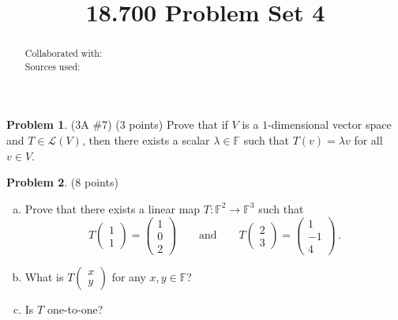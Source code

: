 \documentclass[reqno, 12pt]{amsart}
\theoremstyle{definition}
\newenvironment{problab}[1]
{\noindent\textbf{Problem #1}.}
{\vskip 6pt}
\theoremstyle{remark}
\newtheorem*{soln}{Solution}
\newcommand{\F}{\mathbb F}
\renewcommand{\L}{\mathcal L}
\renewcommand{\abstractname}{}    %
\begin{document}

\title{18.700 Problem Set 4}

\maketitle

\begin{abstract}
  \noindent Collaborated with:\\
  Sources used: 
\end{abstract}
\vskip 0.5cm

\begin{problab}{1} (3A \#7) (3 points)
  Prove that if $V$ is a $1$-dimensional vector space and $T \in \L(V)$, then there exists a scalar $\lambda \in \F$ such that $T(v) = \lambda v$ for all $v \in V$.
\end{problab}


\begin{problab}{2} (8 points)
  \begin{enumerate}[(a)]
    \item 
      Prove that there exists a linear map $T: \F^2 \to \F^3$ such that
      \begin{equation*}
        T \begin{pmatrix}1\\ 1\end{pmatrix} = \begin{pmatrix}1\\ 0\\ 2\end{pmatrix}
        \qquad
        \text{and}
        \qquad
        T \begin{pmatrix}2\\ 3\end{pmatrix} = \begin{pmatrix}1\\ -1\\ 4\end{pmatrix} \, .
      \end{equation*}
    \item
      What is $T\left(\begin{smallmatrix}x\\ y\end{smallmatrix}\right)$ for any $x,y \in \F$?
    \item
      Is $T$ one-to-one?
  \end{enumerate}
\end{problab}
\end{document}
